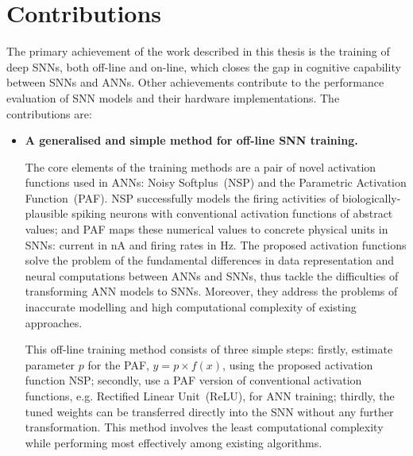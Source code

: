 \section{Contributions}
The primary achievement of the work described in this thesis is the training of deep SNNs, both off-line and on-line, which closes the gap in cognitive capability between SNNs and ANNs.
Other achievements contribute to the performance evaluation of SNN models and their hardware implementations.
The contributions are:
\begin{itemize}
%	
	
	\item 
	\textbf{A generalised and simple method for off-line SNN training.}
	

	The core elements of the training methods are a pair of novel activation functions used in ANNs: Noisy Softplus~(NSP) and the Parametric Activation Function~(PAF).
	NSP successfully models the firing activities of biologically-plausible spiking neurons with conventional activation functions of abstract values;
	and PAF maps these numerical values to concrete physical units in SNNs: current in nA and firing rates in Hz.
	The proposed activation functions solve the problem of the fundamental differences in data representation and neural computations between ANNs and SNNs, thus tackle the difficulties of transforming ANN models to SNNs.
	Moreover, they address the problems of inaccurate modelling and high computational complexity of existing approaches.
	
	This off-line training method consists of three simple steps: firstly, estimate parameter $p$ for the PAF, $y = p \times f(x)$, using the proposed activation function NSP; secondly, use a PAF version of conventional activation functions, e.g. Rectified Linear Unit~(ReLU), for ANN training; %
	thirdly, the tuned weights can be transferred directly into the SNN without any further transformation.
	This method involves the least computational complexity while performing most effectively among existing algorithms.


\end{itemize}
